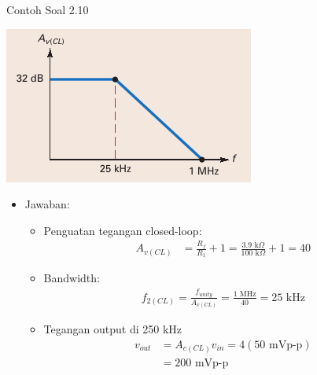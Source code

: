 \begin{frame}{Contoh Soal 2.10}
	\begin{multicols}{2}
		\begin{center}
			\includegraphics[width=0.8\linewidth]{gambar/fig-16.22b}
		\end{center}
		\columnbreak
		\begin{itemize}
			\item Jawaban:
			\begin{itemize}
				\item Penguatan tegangan closed-loop:
				\begin{align*}
					A_{v(CL)} &= \frac{R_f}{R_1} + 1 = \frac{3.9 \text{ k}\Omega}{100 \text{ k}\Omega} + 1 = 40
				\end{align*}
				\item Bandwidth:
				\begin{align*}
					f_{2(CL)} = \frac{f_{unity}}{A_{v(CL)}} = \frac{1 \text{ MHz}}{40} = 25 \text{ kHz}
				\end{align*}
				\item Tegangan output di 250 kHz
				\begin{align*}
					v_{out} &= A_{c(CL)} v_{in} = 4(50 \text{ mVp-p})\\
					&= 200 \text{ mVp-p}
				\end{align*}
			\end{itemize}
		\end{itemize}
	\end{multicols}
\end{frame}

